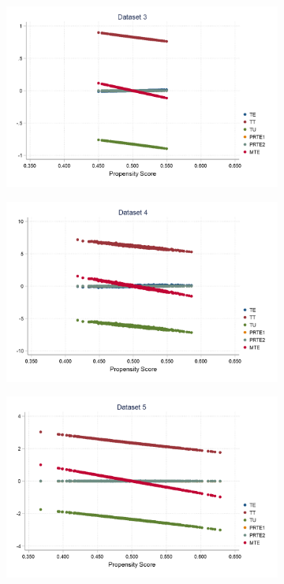 \documentclass{article}
\begin{document}
\begin{solution}
\begin{figure}[H]
\begin{subfigure}[b]{0.43\textwidth}
        \includegraphics[width=\textwidth]{ps2Heckman/figures/q8_partb_d3_all.png}
    \end{subfigure}
    \begin{subfigure}[b]{0.43\textwidth}
        \centering
        \includegraphics[width=\textwidth]{ps2Heckman/figures/q8_partb_d4_all.png}
    \end{subfigure}
    \begin{subfigure}[b]{0.43\textwidth}
        \centering
        \includegraphics[width=\textwidth]{ps2Heckman/figures/q8_partb_d5_all.png}
    \end{subfigure}
\end{figure}


\end{solution}
\end{document}
